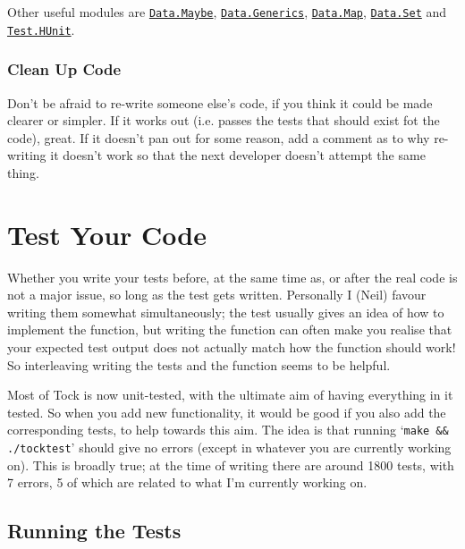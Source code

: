 \documentclass[a4wide]{article}
\begin{document}
Other useful modules are
  \href{http://haskell.org/ghc/docs/6.6/html/libraries/base/Data-Maybe.html}{\lstinline|Data.Maybe|},
  \href{http://haskell.org/ghc/docs/6.6/html/libraries/base/Data-Generics.html}{\lstinline|Data.Generics|},
  \href{http://haskell.org/ghc/docs/6.6/html/libraries/base/Data-Map.html}{\lstinline|Data.Map|},
  \href{http://haskell.org/ghc/docs/6.6/html/libraries/base/Data-Set.html}{\lstinline|Data.Set|} and
  \href{http://haskell.org/ghc/docs/6.6/html/libraries/HUnit/Test-HUnit.html}{\lstinline|Test.HUnit|}.

\subsubsection{Clean Up Code}

Don't be afraid to re-write someone else's code, if you think it could be made clearer or simpler.
If it works out (i.e. passes the tests that should exist fot the code), great.  If it doesn't pan out
for some reason, add a comment as to why re-writing it doesn't work so that the next developer doesn't
attempt the same thing.

\section{Test Your Code}

Whether you write your tests before, at the same time as, or after the real code is not a major issue, so long
as the test gets written.  Personally I (Neil) favour writing them somewhat simultaneously; the test usually
gives an idea of how to implement the function, but writing the function can often make you realise that your
expected test output does not actually match how the function should work!  So interleaving writing the tests
and the function seems to be helpful.

Most of Tock is now unit-tested, with the ultimate aim of having everything in it tested.  So when you add
new functionality, it would be good if you also add the corresponding tests, to help towards this aim.
The idea is that running `\verb|make && ./tocktest|' should give no errors (except in whatever
you are currently working on).  This is broadly true; at the time of writing there are around 1800 tests, with
7 errors, 5 of which are related to what I'm currently working on.

\subsection{Running the Tests}
\end{document}
